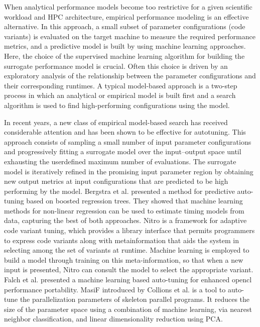 When analytical performance models become too restrictive for a given scientific workload and HPC architecture, empirical performance modeling is an effective alternative. In this approach, a small subset of parameter configurations (code variants) is evaluated on the target machine to measure the required performance metrics, and a predictive model is built by using machine learning approaches. Here, the choice of the supervised machine learning algorithm for building the surrogate performance model is crucial. Often this choice is driven by an exploratory analysis of the relationship between the parameter configurations and their corresponding runtimes. A typical model-based approach is a two-step process in which an analytical or empirical model is built first and a search algorithm is used to find high-performing configurations using the model.

In recent years, a new class of empirical model-based search has received considerable attention and has been shown to be effective for autotuning. This approach consists of sampling a small number of input parameter configurations and progressively fitting a surrogate model over the input–output space until exhausting the userdefined maximum number of evaluations. The surrogate model is iteratively refined in the promising input parameter region by obtaining new output metrics at input configurations that are predicted to be high performing by the model. Bergstra et al. \cite{bergstra2012machine} presented a method for predictive auto-tuning based on boosted regression trees. They showed that machine learning methods for non-linear regression can be used to estimate timing models from data, capturing the best of both approaches. Nitro \cite{muralidharan2014nitro} is a framework for adaptive code variant tuning, which  provides a library interface that permits programmers to express code variants along with metainformation that aids the system in selecting among the set of variants at runtime. Machine learning is employed to build a model through training on this meta-information, so that when a new input is presented, Nitro can consult the model to select the appropriate variant. Falch et al. \cite{falch2015machine} presented a machine learning based auto-tuning for enhanced opencl performance portability. MasiF introduced by Collions et al. \cite{collins2013masif} is a tool to auto-tune the parallelization parameters of skeleton parallel programs. It reduces the size of the parameter space using a combination of machine learning, via nearest neighbor classification, and linear dimensionality reduction using PCA.

